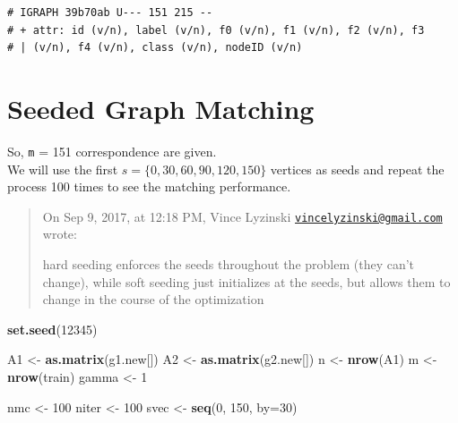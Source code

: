 \documentclass[]{article}
\newenvironment{Shaded}{\begin{snugshade}}{\end{snugshade}}
\newcommand{\KeywordTok}[1]{\textcolor[rgb]{0.13,0.29,0.53}{\textbf{#1}}}
\newcommand{\DataTypeTok}[1]{\textcolor[rgb]{0.13,0.29,0.53}{#1}}
\newcommand{\DecValTok}[1]{\textcolor[rgb]{0.00,0.00,0.81}{#1}}
\newcommand{\StringTok}[1]{\textcolor[rgb]{0.31,0.60,0.02}{#1}}
\newcommand{\NormalTok}[1]{#1}
\begin{document}
\begin{verbatim}
# IGRAPH 39b70ab U--- 151 215 -- 
# + attr: id (v/n), label (v/n), f0 (v/n), f1 (v/n), f2 (v/n), f3
# | (v/n), f4 (v/n), class (v/n), nodeID (v/n)
\end{verbatim}

\section{Seeded Graph Matching}\label{seeded-graph-matching}

So, \texttt{m} = 151 correspondence are given.\\
We will use the first \(s = \{0,30,60,90,120, 150\}\) vertices as seeds
and repeat the process 100 times to see the matching performance.

\begin{quote}
On Sep 9, 2017, at 12:18 PM, Vince Lyzinski
\href{mailto:vincelyzinski@gmail.com}{\nolinkurl{vincelyzinski@gmail.com}}
wrote:

hard seeding enforces the seeds throughout the problem (they can't
change), while soft seeding just initializes at the seeds, but allows
them to change in the course of the optimization
\end{quote}

\begin{Shaded}
\begin{Highlighting}[]
\KeywordTok{set.seed}\NormalTok{(}\DecValTok{12345}\NormalTok{)}

\NormalTok{A1 <-}\StringTok{ }\KeywordTok{as.matrix}\NormalTok{(g1.new[])}
\NormalTok{A2 <-}\StringTok{ }\KeywordTok{as.matrix}\NormalTok{(g2.new[])}
\NormalTok{n <-}\StringTok{ }\KeywordTok{nrow}\NormalTok{(A1)}
\NormalTok{m <-}\StringTok{ }\KeywordTok{nrow}\NormalTok{(train)}
\NormalTok{gamma <-}\StringTok{ }\DecValTok{1}

\NormalTok{nmc <-}\StringTok{ }\DecValTok{100}
\NormalTok{niter <-}\StringTok{ }\DecValTok{100}
\NormalTok{svec <-}\StringTok{ }\KeywordTok{seq}\NormalTok{(}\DecValTok{0}\NormalTok{, }\DecValTok{150}\NormalTok{, }\DataTypeTok{by=}\DecValTok{30}\NormalTok{)}
\end{Highlighting}
\end{Shaded}
\end{document}
